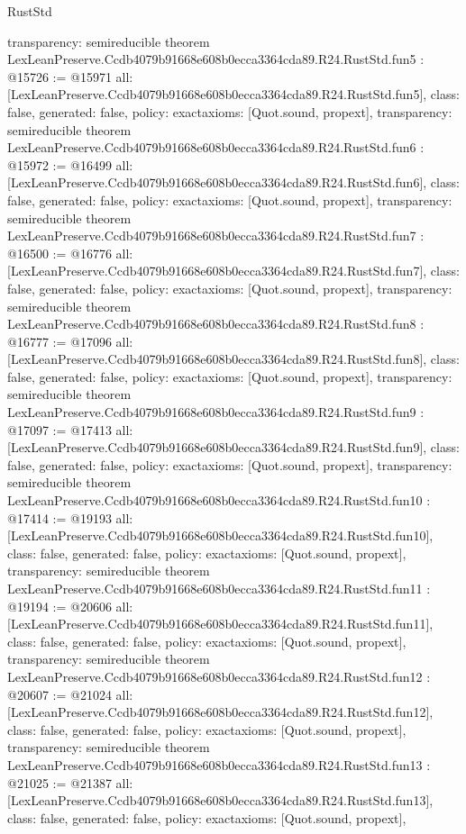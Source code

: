 \begin{lexlean}{RustStd}
\begin{coremodule}
{  transparency: semireducible
}
theorem LexLeanPreserve.Ccdb4079b91668e608b0ecca3364cda89.R24.RustStd.fun5 : @15726 := @15971 {
  all: [LexLeanPreserve.Ccdb4079b91668e608b0ecca3364cda89.R24.RustStd.fun5],
  class: false,
  generated: false,
  policy: exact{axioms: [Quot.sound, propext]},
  transparency: semireducible
}
theorem LexLeanPreserve.Ccdb4079b91668e608b0ecca3364cda89.R24.RustStd.fun6 : @15972 := @16499 {
  all: [LexLeanPreserve.Ccdb4079b91668e608b0ecca3364cda89.R24.RustStd.fun6],
  class: false,
  generated: false,
  policy: exact{axioms: [Quot.sound, propext]},
  transparency: semireducible
}
theorem LexLeanPreserve.Ccdb4079b91668e608b0ecca3364cda89.R24.RustStd.fun7 : @16500 := @16776 {
  all: [LexLeanPreserve.Ccdb4079b91668e608b0ecca3364cda89.R24.RustStd.fun7],
  class: false,
  generated: false,
  policy: exact{axioms: [Quot.sound, propext]},
  transparency: semireducible
}
theorem LexLeanPreserve.Ccdb4079b91668e608b0ecca3364cda89.R24.RustStd.fun8 : @16777 := @17096 {
  all: [LexLeanPreserve.Ccdb4079b91668e608b0ecca3364cda89.R24.RustStd.fun8],
  class: false,
  generated: false,
  policy: exact{axioms: [Quot.sound, propext]},
  transparency: semireducible
}
theorem LexLeanPreserve.Ccdb4079b91668e608b0ecca3364cda89.R24.RustStd.fun9 : @17097 := @17413 {
  all: [LexLeanPreserve.Ccdb4079b91668e608b0ecca3364cda89.R24.RustStd.fun9],
  class: false,
  generated: false,
  policy: exact{axioms: [Quot.sound, propext]},
  transparency: semireducible
}
theorem LexLeanPreserve.Ccdb4079b91668e608b0ecca3364cda89.R24.RustStd.fun10 : @17414 := @19193 {
  all: [LexLeanPreserve.Ccdb4079b91668e608b0ecca3364cda89.R24.RustStd.fun10],
  class: false,
  generated: false,
  policy: exact{axioms: [Quot.sound, propext]},
  transparency: semireducible
}
theorem LexLeanPreserve.Ccdb4079b91668e608b0ecca3364cda89.R24.RustStd.fun11 : @19194 := @20606 {
  all: [LexLeanPreserve.Ccdb4079b91668e608b0ecca3364cda89.R24.RustStd.fun11],
  class: false,
  generated: false,
  policy: exact{axioms: [Quot.sound, propext]},
  transparency: semireducible
}
theorem LexLeanPreserve.Ccdb4079b91668e608b0ecca3364cda89.R24.RustStd.fun12 : @20607 := @21024 {
  all: [LexLeanPreserve.Ccdb4079b91668e608b0ecca3364cda89.R24.RustStd.fun12],
  class: false,
  generated: false,
  policy: exact{axioms: [Quot.sound, propext]},
  transparency: semireducible
}
theorem LexLeanPreserve.Ccdb4079b91668e608b0ecca3364cda89.R24.RustStd.fun13 : @21025 := @21387 {
  all: [LexLeanPreserve.Ccdb4079b91668e608b0ecca3364cda89.R24.RustStd.fun13],
  class: false,
  generated: false,
  policy: exact{axioms: [Quot.sound, propext]},
}
\end{coremodule}
\end{lexlean}
